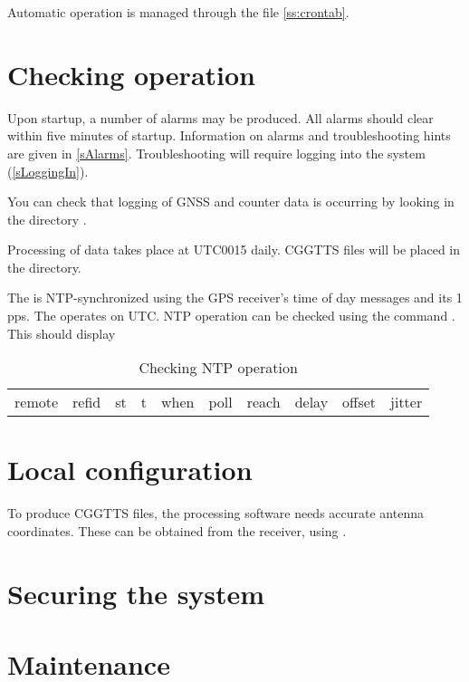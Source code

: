 Automatic operation is managed through the   file \ref{ss:crontab}.
\section{Checking  operation}

Upon startup, a number of alarms may be produced. 
All alarms should clear within five minutes of startup.
Information on alarms and troubleshooting hints are given in \ref{sAlarms}. Troubleshooting
will require logging into the system (\ref{sLoggingIn}).

You can check that logging of GNSS and counter data is occurring by looking in the directory 
.

Processing of data takes place at UTC0015 daily. CGGTTS files will be placed in the 
 directory.

The \sysname{} is NTP-synchronized using the GPS receiver's time of day messages and its 1 pps. 
The \sysname{} operates on UTC. 
NTP operation can be checked using the command . This should display 

\begin{table}
\begin{tabular}{clrrrrrrrr}
     remote      &     refid   &   st & t &  when &poll & reach  &  delay &  offset & jitter \\

\end{tabular}
\caption{Checking NTP operation}
\end{table}

\section{Local configuration}

To produce CGGTTS files, the processing software needs accurate antenna coordinates.
These can be obtained from the \sysname{} receiver, using .

\section{Securing the system}

\section{Maintenance}

